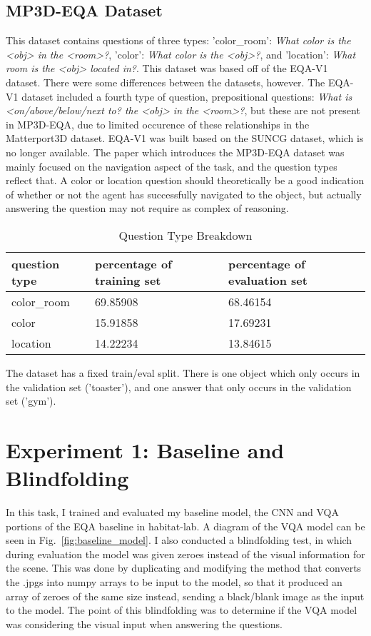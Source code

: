 \subsection{MP3D-EQA Dataset} 
This dataset contains questions of three types: 'color\_room': \emph{What color is the <obj> in the <room>?}, 'color': \emph{What color is the <obj>?}, and 'location': \emph{What room is the <obj> located in?}. This dataset was based off of the EQA-V1 dataset\cite{embodiedqa}. There were some differences between the datasets, however. The EQA-V1 dataset included a fourth type of question, prepositional questions: \emph{What is <on/above/below/next to? the <obj> in the <room>?}, but these are not present in MP3D-EQA, due to limited occurence of these relationships in the Matterport3D dataset. EQA-V1 was built based on the SUNCG dataset, which is no longer available. 
The paper which introduces the MP3D-EQA dataset was mainly focused on the navigation aspect of the task, and the question types reflect that. A color or location question should theoretically be a good indication of whether or not the agent has successfully navigated to the object, but actually answering the question may not require as complex of reasoning. 

\begin{table}[h]
\centering
\caption{Question Type Breakdown}
\begin{tabular}{ |l|l|l| }
\hline
\textbf{question type} & \textbf{percentage of training set} & \textbf{percentage of evaluation set} \\
\hline
color\_room & 69.85908 & 68.46154\\
color & 15.91858 & 17.69231\\
location & 14.22234 & 13.84615\\
\hline
\end{tabular}
\label{tab:q_breakdown}
\end{table}

The dataset has a fixed train/eval split. There is one object which only occurs in the validation set ('toaster'), and one answer that only occurs in the validation set ('gym'). 

\section{Experiment 1: Baseline and Blindfolding}
\label{sec:exp_1}
In this task, I trained and evaluated my baseline model, the CNN and VQA portions of the EQA baseline in habitat-lab. A diagram of the VQA model can be seen in Fig.~\ref{fig:baseline_model}. I also conducted a blindfolding test, in which during evaluation the model was given zeroes instead of the visual information for the scene. This was done by duplicating and modifying the method that converts the .jpgs into numpy arrays to be input to the model, so that it produced an array of zeroes of the same size instead, sending a black/blank image as the input to the model. The point of this blindfolding was to determine if the VQA model was considering the visual input when answering the questions. 

